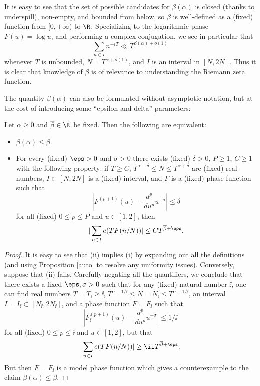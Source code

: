 
It is easy to see that the set of possible candidates for $\beta(\alpha)$ is closed (thanks to underspill), non-empty, and bounded from below, so $\beta$ is well-defined as a (fixed) function from $[0,+\infty)$ to $\R$.  Specializing to the logarithmic phase $F(u) = \log u$, and performing a complex conjugation, we see in particular that
\begin{equation}\label{beta-alpha}
    \sum_{n \in I} n^{-iT} \ll T^{\beta(\alpha)+o(1)}
\end{equation}
whenever $T$ is unbounded, $N = T^{\alpha+o(1)}$, and $I$ is an interval in $[N,2N]$.  Thus it is clear that knowledge of $\beta$ is of relevance to understanding the Riemann zeta function.


The quantity $\beta(\alpha)$ can also be formulated without asymptotic notation, but at the cost of introducing some ``epsilon and delta'' parameters:

\begin{lemma}\label{beta-asymp}
\leanok
Let $\alpha \geq 0$ and $\overline{\beta} \in \R$ be fixed.  Then the following are equivalent:
\begin{itemize}
\item[(i)] $\beta(\alpha) \leq \overline{\beta}$.
\item[(ii)] For every (fixed) $\eps>0$ and $\sigma > 0$ there exists (fixed) $\delta>0$, $P \geq 1$, $C \geq 1$ with the following property: if $T \geq C$, $T^{\alpha-\delta} \leq N \leq T^{\alpha+\delta}$ are (fixed) real numbers, $I \subset [N,2N]$ is a (fixed) interval, and $F$ is a (fixed) phase function such that
\begin{equation}\label{fpu-bound}
     \left|F^{(p+1)}(u) - \frac{d^p}{du^p} u^{-\sigma}\right| \leq \delta
\end{equation}
for all (fixed) $0 \leq p \leq P$ and $u \in [1,2]$, then
$$ |\sum_{n \in I} e(T F(n/N))| \leq C T^{\overline{\beta}+\eps}.$$
\end{itemize}
\end{lemma}

\begin{proof}\leanok  It is easy to see that (ii) implies (i) by expanding out all the definitions (and using Proposition \ref{auto} to resolve any uniformity issues).  Conversely, suppose that (ii) fails.  Carefully negating all the quantifiers, we conclude that there exists a fixed $\eps, \sigma > 0$ such that for any (fixed) natural number $\ii$, one can find real numbers $T = T_{\ii} \geq \ii$, $T^{\alpha-1/\ii} \leq N = N_{\ii} \leq T^{\alpha+1/\ii}$, an interval $I = I_{\ii} \subset [N_\ii, 2N_\ii]$, and a phase function $F = F_{\ii}$ such that
$$ |F_\ii^{(p+1)}(u) - \frac{d^p}{du^p} u^{-\sigma}| \leq 1/\ii$$
for all (fixed) $0 \leq p \leq \ii$ and $u \in [1,2]$, but that
$$ |\sum_{n \in I} e(T F(n/N))| \geq \ii T^{\overline{\beta}+\eps}.$$
But then $F = F_\ii$ is a model phase function which gives a counterexample to the claim $\beta(\alpha) \leq \overline{\beta}$.
\end{proof}

